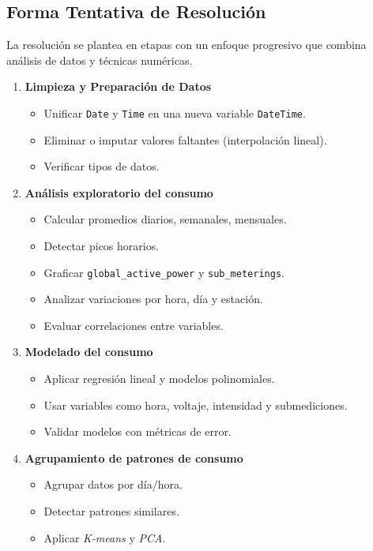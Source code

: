 \documentclass[12pt]{report}
\begin{document}
\subsection*{Forma Tentativa de Resolución}

La resolución se plantea en etapas con un enfoque progresivo que combina análisis de datos y técnicas numéricas.

\begin{enumerate}
    \item \textbf{Limpieza y Preparación de Datos}
    \begin{itemize}
        \item Unificar \texttt{Date} y \texttt{Time} en una nueva variable \texttt{DateTime}.
        \item Eliminar o imputar valores faltantes (interpolación lineal).
        \item Verificar tipos de datos.
    \end{itemize}
    
    \item \textbf{Análisis exploratorio del consumo}
    \begin{itemize}
        \item Calcular promedios diarios, semanales, mensuales.
        \item Detectar picos horarios.
        \item Graficar \texttt{global\_active\_power} y \texttt{sub\_meterings}.
        \item Analizar variaciones por hora, día y estación.
        \item Evaluar correlaciones entre variables.
    \end{itemize}
    
    \item \textbf{Modelado del consumo}
    \begin{itemize}
        \item Aplicar regresión lineal y modelos polinomiales.
        \item Usar variables como hora, voltaje, intensidad y submediciones.
        \item Validar modelos con métricas de error.
    \end{itemize}

    \item \textbf{Agrupamiento de patrones de consumo}
    \begin{itemize}
        \item Agrupar datos por día/hora.
        \item Detectar patrones similares.
        \item Aplicar \textit{K-means} y \textit{PCA}.
    \end{itemize}


\end{enumerate}
\end{document}
